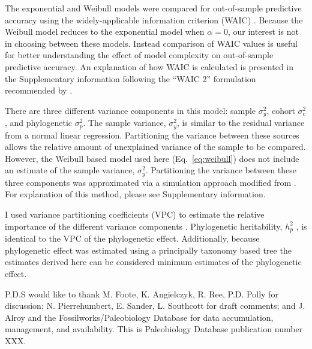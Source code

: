 \documentclass{pnastwo}
\begin{document}
\begin{article}
\begin{materials}
The exponential and Weibull models were compared for out-of-sample predictive accuracy using the widely-applicable information criterion (WAIC) \cite{Watanabe2010a}. Because the Weibull model reduces to the exponential model when \(\alpha = 0\), our interest is not in choosing between these models. Instead comparison of WAIC values is useful for better understanding the effect of model complexity on out-of-sample predictive accuracy. An explanation of how WAIC is calculated is presented in the Supplementary information following the ``WAIC 2'' formulation recommended by \cite{Gelman2013d}.

There are three different variance components in this model: sample \(\sigma_{y}^{2}\), cohort \(\sigma_{c}^{2}\), and phylogenetic \(\sigma_{p}^{2}\). The sample variance, \(\sigma_{y}^{2}\), is similar to the residual variance from a normal linear regression. Partitioning the variance between these sources allows the relative amount of unexplained variance of the sample to be compared. However, the Weibull based model used here (Eq.~\ref{eq:weibull}) does not include an estimate of the sample variance, \(\sigma_{y}^{2}\). Partitioning the variance between these three components was approximated via a simulation approach modified from \cite{Goldstein2002}. For explanation of this method, please see Supplementary information.

I used variance partitioning coefficients (VPC) to estimate the relative importance of the different variance components \cite{Gelman2007}. Phylogenetic heritability, \(h_{p}^{2}\) \cite{Lynch1991,Housworth2004}, is identical to the VPC of the phylogenetic effect. Additionally, because phylogenetic effect was estimated using a principally taxonomy based tree the estimates derived here can be considered minimum estimates of the phylogenetic effect.
\end{materials}

\begin{acknowledgments}
P.D.S would like to thank M. Foote, K. Angielczyk, R. Ree, P.D. Polly for discussion; N. Pierrehumbert, E. Sander, L. Southcott for draft comments; and J. Alroy and the Fossilworks/Paleobiology Database for data accumulation, management, and availability. This is Paleobiology Database publication number XXX.
\end{acknowledgments}



\end{article}
\end{document}
